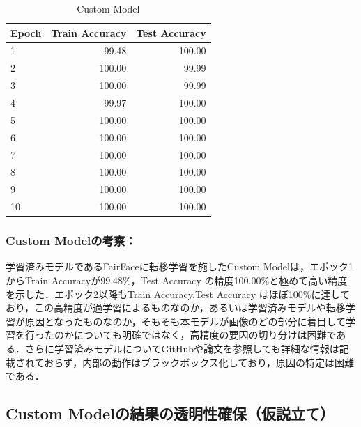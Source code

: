\documentclass[a4paper,11pt,titlepage]{jsarticle}
\begin{document}
\begin{table}[H]
\centering
\caption{Custom Model}
\label{tab:Custom}
\begin{tabular}{lrr}
\hline
 Epoch &  Train Accuracy &  Test Accuracy \\
\hline
     1 &           99.48 &               100.00 \\
     2 &          100.00 &                99.99 \\
     3 &          100.00 &                99.99 \\
     4 &           99.97 &               100.00 \\
     5 &          100.00 &               100.00 \\
     6 &          100.00 &               100.00 \\
     7 &          100.00 &               100.00 \\
     8 &          100.00 &               100.00 \\
     9 &          100.00 &               100.00 \\
    10 &          100.00 &               100.00 \\
\hline
\end{tabular}
\end{table}
% 

\subsubsection*{Custom Modelの考察：}
学習済みモデルであるFairFaceに転移学習を施したCustom Modelは，エポック1からTrain Accuracyが99.48\%，Test Accuracy の精度100.00\%と極めて高い精度を示した．エポック2以降もTrain Accuracy,Test Accuracy はほぼ100\%に達しており，この高精度が過学習によるものなのか，あるいは学習済みモデルや転移学習が原因となったものなのか，そもそも本モデルが画像のどの部分に着目して学習を行ったのかについても明確ではなく，高精度の要因の切り分けは困難である．さらに学習済みモデルについてGitHubや論文を参照しても詳細な情報は記載されておらず，内部の動作はブラックボックス化しており，原因の特定は困難である．\par

\subsection{Custom Modelの結果の透明性確保（仮説立て）}
\label{label:仮設立て}
\end{document}
